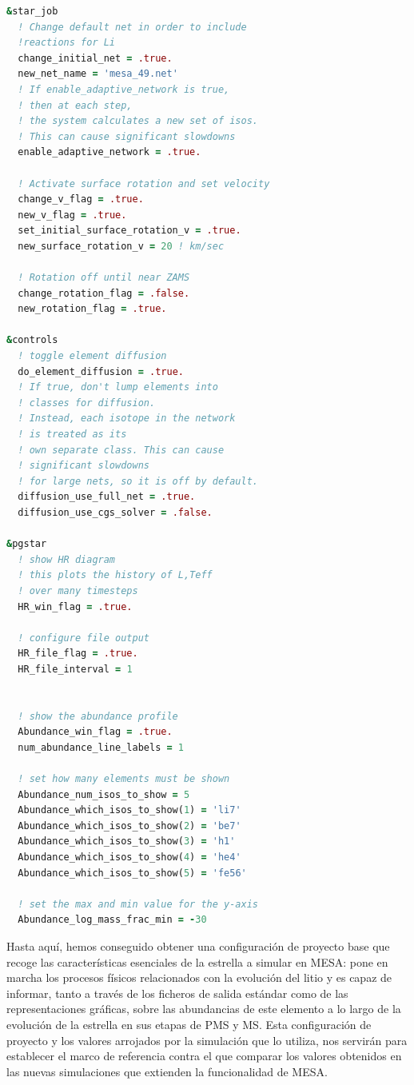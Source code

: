 \begin{lstlisting}[language=Fortran, float, caption={Parametrización de los procesos relacionados con el tratamiento del litio y su evolución temporal.}, label={lst:li_evol}]
&star_job
  ! Change default net in order to include 
  !reactions for Li
  change_initial_net = .true.
  new_net_name = 'mesa_49.net'
  ! If enable_adaptive_network is true, 
  ! then at each step, 
  ! the system calculates a new set of isos. 
  ! This can cause significant slowdowns
  enable_adaptive_network = .true.

  ! Activate surface rotation and set velocity
  change_v_flag = .true.
  new_v_flag = .true.
  set_initial_surface_rotation_v = .true.
  new_surface_rotation_v = 20 ! km/sec 

  ! Rotation off until near ZAMS
  change_rotation_flag = .false.
  new_rotation_flag = .true.

&controls
  ! toggle element diffusion
  do_element_diffusion = .true.
  ! If true, don't lump elements into 
  ! classes for diffusion. 
  ! Instead, each isotope in the network 
  ! is treated as its 
  ! own separate class. This can cause 
  ! significant slowdowns 
  ! for large nets, so it is off by default.
  diffusion_use_full_net = .true.
  diffusion_use_cgs_solver = .false.

&pgstar
  ! show HR diagram
  ! this plots the history of L,Teff 
  ! over many timesteps
  HR_win_flag = .true.

  ! configure file output 
  HR_file_flag = .true.
  HR_file_interval = 1


  ! show the abundance profile
  Abundance_win_flag = .true.
  num_abundance_line_labels = 1

  ! set how many elements must be shown
  Abundance_num_isos_to_show = 5
  Abundance_which_isos_to_show(1) = 'li7'
  Abundance_which_isos_to_show(2) = 'be7'
  Abundance_which_isos_to_show(3) = 'h1'
  Abundance_which_isos_to_show(4) = 'he4'
  Abundance_which_isos_to_show(5) = 'fe56'

  ! set the max and min value for the y-axis
  Abundance_log_mass_frac_min = -30
\end{lstlisting}

Hasta aquí, hemos conseguido obtener una configuración de proyecto base que recoge las características esenciales de la estrella a simular en MESA: pone en marcha los procesos físicos relacionados con la evolución del litio y es capaz de informar, tanto a través de los ficheros de salida estándar como de las representaciones gráficas, sobre las abundancias de este elemento a lo largo de la evolución de la estrella en sus etapas de PMS y MS. Esta configuración de proyecto y los valores arrojados por la simulación que lo utiliza, nos servirán para establecer el marco de referencia contra el que comparar los valores obtenidos en las nuevas simulaciones que extienden la funcionalidad de MESA.\par


